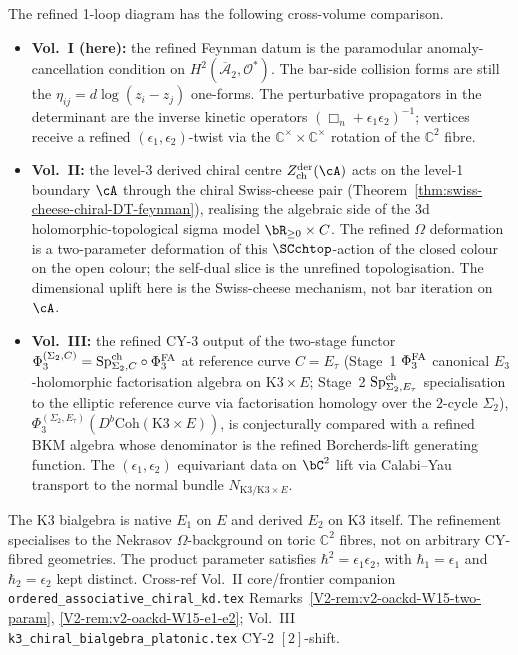 \begin{remark}
\label{rem:feyn-W15-cross-volume}
The refined 1-loop diagram has the following cross-volume comparison.
\begin{itemize}
\item \textbf{Vol.~I (here):} the refined Feynman datum is the
 paramodular anomaly-cancellation condition on
 $H^2(\overline{\mathcal A}_2, \mathcal O^*)$. The bar-side collision
 forms are still the $\eta_{ij} = d\log(z_i - z_j)$ one-forms.  The
 perturbative propagators in the determinant are the inverse kinetic
 operators $(\Box_n+\epsilon_1\epsilon_2)^{-1}$; vertices receive a
 refined $(\epsilon_1, \epsilon_2)$-twist via the $\mathbb C^\times
 \times \mathbb C^\times$ rotation of the $\mathbb C^2$ fibre.
\item \textbf{Vol.~II:} the level-3 derived chiral centre
 $Z^{\mathrm{der}}_{\mathrm{ch}}(\cA)$ acts on the level-1
 boundary $\cA$ through the chiral Swiss-cheese pair
 (Theorem~\ref{thm:swiss-cheese-chiral-DT-feynman}), realising the
 algebraic side of the $3$d holomorphic-topological sigma model
 $\bR_{\geq 0} \times C$. The refined $\Omega$ deformation is a
 two-parameter deformation of this $\SCchtop$-action of the closed
 colour on the open colour; the self-dual slice is the unrefined
 topologisation. The dimensional uplift here is the Swiss-cheese
 mechanism, not bar iteration on $\cA$.
\item \textbf{Vol.~III:} the refined CY-$3$ output of the two-stage
 functor $\Phi_3^{(\Sigma_2, C)} = \mathrm{Sp}^{\mathrm{ch}}_{\Sigma_2, C} \circ
 \Phi^{\mathrm{FA}}_3$ at reference curve $C = E_\tau$
 \textup{(}Stage~1 $\Phi^{\mathrm{FA}}_3$ canonical $E_3$-holomorphic
 factorisation algebra on $\mathrm{K3} \times E$; Stage~2
 $\mathrm{Sp}^{\mathrm{ch}}_{\Sigma_2, E_\tau}$ specialisation to the elliptic
 reference curve via factorisation homology over the $2$-cycle
 $\Sigma_2$\textup{)},
 $\Phi_3^{(\Sigma_2, E_\tau)}(D^b\mathrm{Coh}(\mathrm{K3} \times E))$,
 is conjecturally compared with a refined BKM algebra whose denominator
 is the refined Borcherds-lift generating function. The
 $(\epsilon_1, \epsilon_2)$ equivariant data on $\bC^2$ lift via
 Calabi--Yau transport to the normal bundle
 $N_{\mathrm{K3}/\mathrm{K3} \times E}$.
\end{itemize}
The K3 bialgebra is native $E_1$ on $E$ and derived $E_2$ on K3
itself.  The refinement specialises to the Nekrasov $\Omega$-background
on toric $\mathbb C^2$ fibres, not on arbitrary CY-fibred geometries.
The product parameter satisfies
$\hbar^2 = \epsilon_1\epsilon_2$, with
$\hbar_1 = \epsilon_1$ and $\hbar_2 = \epsilon_2$ kept distinct.
Cross-ref Vol.~II
core/frontier companion \texttt{ordered\_associative\_chiral\_kd.tex}
Remarks~\ref{V2-rem:v2-oackd-W15-two-param},
\ref{V2-rem:v2-oackd-W15-e1-e2};
Vol.~III \texttt{k3\_chiral\_bialgebra\_platonic.tex} CY-2 $[2]$-shift.
\end{remark}

